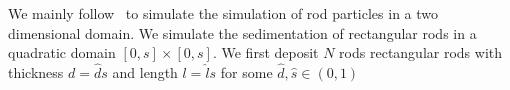 We mainly follow~\cite{SED} to simulate the simulation of rod particles in a two dimensional domain.
We simulate the sedimentation of rectangular rods in a quadratic domain $[0,s]×[0,s]$. We first deposit $N$ rods rectangular rods with thickness $d = \hat ds$ and length $l = \hat ls$ for some $\hat d,\hat s∈(0,1)$
\cite{BD}
 
